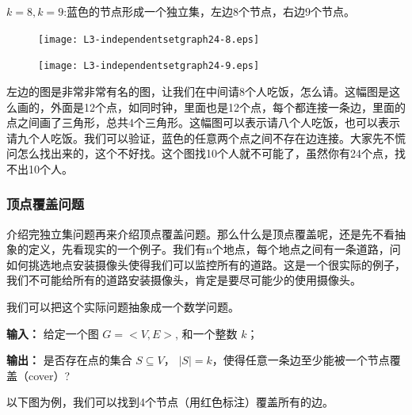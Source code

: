$k=8,k=9$:蓝色的节点形成一个独立集，左边8个节点，右边9个节点。

\begin{figure}[H]
	\centering
	\begin{minipage}{0.45\textwidth}
 		\texttt{[image: L3-independentsetgraph24-8.eps]} 
 	\end{minipage}
	\begin{minipage}{0.45\textwidth}
 		\texttt{[image: L3-independentsetgraph24-9.eps]} 
	\end{minipage}
\end{figure}
左边的图是非常非常有名的图，让我们在中间请8个人吃饭，怎么请。这幅图是这么画的，外面是12个点，如同时钟，里面也是12个点，每个都连接一条边，里面的点之间画了三角形，总共4个三角形。这幅图可以表示请八个人吃饭，也可以表示请九个人吃饭。我们可以验证，蓝色的任意两个点之间不存在边连接。大家先不慌问怎么找出来的，这个不好找。这个图找10个人就不可能了，虽然你有24个点，找不出10个人。

\subsubsection{顶点覆盖问题}

介绍完独立集问题再来介绍顶点覆盖问题。那么什么是顶点覆盖呢，还是先不看抽象的定义，先看现实的一个例子。我们有n个地点，每个地点之间有一条道路，问如何挑选地点安装摄像头使得我们可以监控所有的道路。这是一个很实际的例子，我们不可能给所有的道路安装摄像头，肯定是要尽可能少的使用摄像头。

我们可以把这个实际问题抽象成一个数学问题。

 {\bf 输入：} 给定一个图 $G=<V,E>$, 和一个整数 $k$；

 {\bf 输出：} 是否存在点的集合 $S  \subseteq V$， $|S| = k$，使得任意一条边至少能被一个节点覆盖（cover）? 

 以下图为例，我们可以找到4个节点（用红色标注）覆盖所有的边。

\begin{figure}[H]
\centering
{}

\end{figure}

